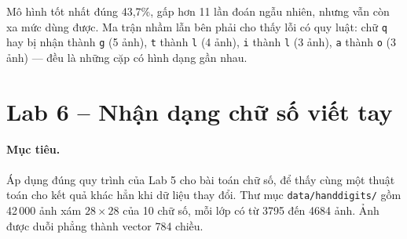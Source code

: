 
Mô hình tốt nhất đúng 43,7\%, gấp hơn 11 lần đoán ngẫu nhiên, nhưng vẫn còn xa mức dùng được. Ma trận nhầm lẫn bên phải cho thấy lỗi có quy luật: chữ \texttt{q} hay bị nhận thành \texttt{g} (5 ảnh), \texttt{t} thành \texttt{l} (4 ảnh), \texttt{i} thành \texttt{l} (3 ảnh), \texttt{a} thành \texttt{o} (3 ảnh) --- đều là những cặp có hình dạng gần nhau.

\section{Lab 6 -- Nhận dạng chữ số viết tay}
\label{sec:lab-digits}

\paragraph{Mục tiêu.} Áp dụng đúng quy trình của Lab 5 cho bài toán chữ số, để thấy cùng một thuật toán cho kết quả khác hẳn khi dữ liệu thay đổi. Thư mục \texttt{data/handdigits/} gồm 42\,000 ảnh xám $28 \times 28$ của 10 chữ số, mỗi lớp có từ 3795 đến 4684 ảnh. Ảnh được duỗi phẳng thành vector 784 chiều.


